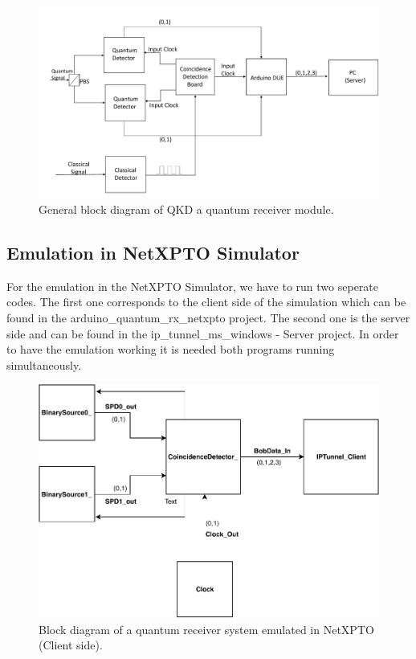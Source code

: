 \begin{refsection}
	\begin{figure}[H]
		\centering
		\includegraphics[width=0.95\linewidth]{./sdf/arduino_quantum_rx/figures/DiagramaGeral.pdf}
		\caption{General block diagram of QKD a quantum receiver module.}
		\label{fig:arduino}
	\end{figure}


		
	\subsection{Emulation in NetXPTO Simulator}
	
	For the emulation in the NetXPTO Simulator, we have to run two seperate codes. The first one corresponds to the client side of the simulation which can be found in the arduino\_quantum\_rx\_netxpto project. The second one is the server side and can be found in the ip\_tunnel\_ms\_windows - Server project. In order to have the emulation working it is needed both programs running simultaneously.
	
	\begin{figure}[H]
		\centering
		\includegraphics[width=0.9\linewidth]{./sdf/arduino_quantum_rx/figures/NetXPTO_implementation.pdf}
		\caption{Block diagram of a quantum receiver system emulated in NetXPTO (Client side).}
		\label{fig:netxpto}
	\end{figure}


\end{refsection}
